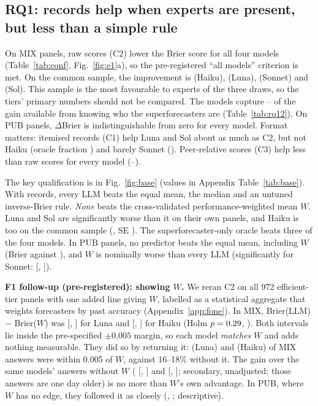 \documentclass[11pt,letterpaper]{article}
\begin{document}
\subsection{RQ1: records help when experts are present, but less than a simple rule}\label{sec:rq1}
On MIX panels, raw scores (C2) lower the Brier score for all four models (Table~\ref{tab:conf}, Fig.~\ref{fig:e1}a),
so the pre-registered ``all models'' criterion is met. On the common sample, the improvement is \eOneCommonHaiku{}
(Haiku), \eOneCommonLuna{} (Luna), \eOneCommonSonnet{} (Sonnet) and \eOneCommonSol{} (Sol). This sample is the most
favourable to experts of the three draws, so the tiers' primary numbers should not be compared. The models capture
\oracleFracSol--\oracleFracSonnet{} of the gain available from knowing who the superforecasters are
(Table~\ref{tab:rq12}). On PUB panels, $\Delta$Brier is indistinguishable from zero for every model.
Format matters: itemised records (C1) help Luna and Sol about as much as C2, but not Haiku (oracle fraction
\oracleFracConeHaiku{}) and barely Sonnet (\oracleFracConeSonnet{}). Peer-relative scores (C3) help less than raw scores for
every model (\oracleFracCthreeHaiku--\oracleFracCthreeLuna).

The key qualification is in Fig.~\ref{fig:base} (values in Appendix Table~\ref{tab:base}). With records, every LLM beats the equal mean,
the median and an untuned inverse-Brier rule. \emph{None} beats the cross-validated performance-weighted mean $W$. Luna
and Sol are significantly worse than it on their own panels, and Haiku is too on the common sample (\haikuCommonW,
SE \haikuCommonWse). The superforecaster-only oracle beats three of the four models. In PUB
panels, no predictor beats the equal mean, including $W$ (Brier \pubBrierWHaiku{} against \pubBrierMeanHaiku{}), and $W$
is nominally worse than every LLM (significantly for Sonnet: \pubWSonnet{} [\pubWLoSonnet, \pubWHiSonnet]).

\textbf{F1 follow-up (pre-registered): showing $W$.} We reran C2 on all 972 efficient-tier panels with one added
line giving $W$, labelled as a statistical aggregate that weights forecasters by past accuracy (Appendix~\ref{app:fone}).
In MIX, Brier(LLM) $-$ Brier($W$) was \foneDWLuna{} [\foneDWLoLuna, \foneDWHiLuna] for Luna and
\foneDWHaiku{} [\foneDWLoHaiku, \foneDWHiHaiku] for Haiku (Holm $p=0.29$, \foneHolmHaiku). Both intervals lie
inside the pre-specified $\pm0.005$ margin, so each model \emph{matches} $W$ and adds nothing measurable. They did so by
returning it: \foneCopyLuna{} (Luna) and \foneCopyHaiku{} (Haiku) of MIX answers were within 0.005 of $W$, against
16--18\% without it. The gain over the same models' answers without $W$ (\foneDCLuna{} [\foneDCLoLuna, \foneDCHiLuna] and \foneDCHaiku{} [\foneDCLoHaiku, \foneDCHiHaiku]; secondary, unadjusted; those answers are one day older) is no
more than $W$'s own advantage. In PUB, where $W$ has no edge, they followed it as closely (\foneCopyPubLuna,
\foneCopyPubHaiku; descriptive).
\end{document}
